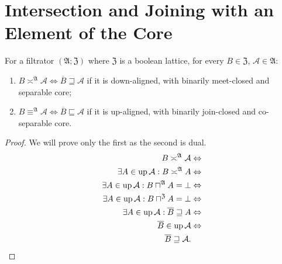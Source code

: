 \section{Intersection and Joining with an Element of the Core}
\begin{lem}\label{int-join-lem}
\label{bool-compl}For a filtrator $(\mathfrak{A};\mathfrak{Z})$
where $\mathfrak{Z}$ is a boolean lattice, for every $B\in\mathfrak{Z}$,
$\mathcal{A}\in\mathfrak{A}$:
\begin{enumerate}
\item $B\asymp^{\mathfrak{A}}\mathcal{A}\Leftrightarrow\overline{B}\sqsupseteq\mathcal{A}$
if it is down-aligned, with binarily meet-closed and separable core;
\item $B\equiv^{\mathfrak{A}}\mathcal{A}\Leftrightarrow\overline{B}\sqsubseteq\mathcal{A}$
if it is up-aligned, with binarily join-closed and co-separable core.
\end{enumerate}
\end{lem}
\begin{proof}
We will prove only the first as the second is dual.
\begin{align*}
B\asymp^{\mathfrak{A}}\mathcal{A} & \Leftrightarrow\\
\exists A\in\operatorname{up}\mathcal{A}:B\asymp^{\mathfrak{A}}A & \Leftrightarrow\\
\exists A\in\operatorname{up}\mathcal{A}:B\sqcap^{\mathfrak{A}}A=\bot & \Leftrightarrow\\
\exists A\in\operatorname{up}\mathcal{A}:B\sqcap^{\mathfrak{Z}}A=\bot & \Leftrightarrow\\
\exists A\in\operatorname{up}\mathcal{A}:\overline{B}\sqsupseteq A & \Leftrightarrow\\
\overline{B}\in\operatorname{up}\mathcal{A} & \Leftrightarrow\\
\overline{B}\sqsupseteq\mathcal{A}.
\end{align*}

\end{proof}


